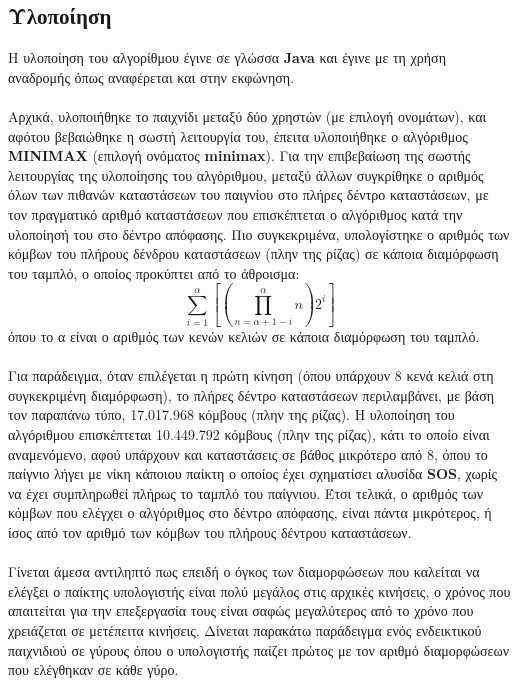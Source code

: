 \documentclass{article}
\begin{document}
    \subsection*{Υλοποίηση}
        Η υλοποίηση του αλγορίθμου έγινε σε γλώσσα \textbf{Java} και έγινε με τη χρήση αναδρομής όπως αναφέρεται και στην εκφώνηση.\\\\
        Αρχικά, υλοποιήθηκε το
        παιχνίδι μεταξύ δύο χρηστών (με επιλογή ονομάτων), και αφότου βεβαιώθηκε η σωστή λειτουργία του, έπειτα
        υλοποιήθηκε ο αλγόριθμος \textbf{MINIMAX} (επιλογή ονόματος \textbf{minimax}). Για την επιβεβαίωση της σωστής λειτουργίας της υλοποίησης του αλγόριθμου, μεταξύ άλλων συγκρίθηκε ο αριθμός όλων των πιθανών καταστάσεων του παιγνίου στο πλήρες δέντρο καταστάσεων, με τον πραγματικό αριθμό καταστάσεων που επισκέπτεται ο αλγόριθμος κατά την υλοποίησή του στο δέντρο απόφασης. Πιο συγκεκριμένα, υπολογίστηκε ο αριθμός των κόμβων του πλήρους δένδρου καταστάσεων (πλην της ρίζας) σε κάποια διαμόρφωση του ταμπλό, ο οποίος προκύπτει από το άθροισμα: $$\sum_{i=1}^{α}\left[\left(\prod_{n=α+1-i}^{α}n\right)2^{i}\right]$$ όπου το α είναι ο αριθμός των κενών κελιών σε κάποια διαμόρφωση του ταμπλό.\\\\
        Για παράδειγμα, όταν επιλέγεται η πρώτη κίνηση (όπου υπάρχουν 8 κενά κελιά στη συγκεκριμένη διαμόρφωση), το πλήρες δέντρο καταστάσεων περιλαμβάνει, με βάση τον παραπάνω τύπο, 17.017.968 κόμβους (πλην της ρίζας). Η υλοποίηση του αλγόριθμου επισκέπτεται 10.449.792 κόμβους (πλην της ρίζας), κάτι το οποίο είναι αναμενόμενο, αφού υπάρχουν και καταστάσεις σε βάθος μικρότερο από 8, όπου το παίγνιο λήγει με νίκη κάποιου παίκτη ο οποίος έχει σχηματίσει αλυσίδα \textbf{SOS}, χωρίς να έχει συμπληρωθεί πλήρως το ταμπλό του παίγνιου. Έτσι τελικά, ο αριθμός των κόμβων που ελέγχει ο αλγόριθμος στο δέντρο απόφασης, είναι πάντα μικρότερος, ή ίσος από τον αριθμό των κόμβων του πλήρους δέντρου καταστάσεων. \\\\
        Γίνεται άμεσα αντιληπτό πως επειδή ο όγκος των διαμορφώσεων που καλείται να ελέγξει ο παίκτης υπολογιστής είναι πολύ μεγάλος στις αρχικές κινήσεις, ο χρόνος που απαιτείται για την επεξεργασία τους είναι σαφώς μεγαλύτερος από το χρόνο που χρειάζεται  σε μετέπειτα κινήσεις. Δίνεται παρακάτω παράδειγμα ενός ενδεικτικού παιχνιδιού σε γύρους όπου ο υπολογιστής παίζει πρώτος με τον αριθμό διαμορφώσεων που ελέγθηκαν σε κάθε γύρο.
\end{document}
